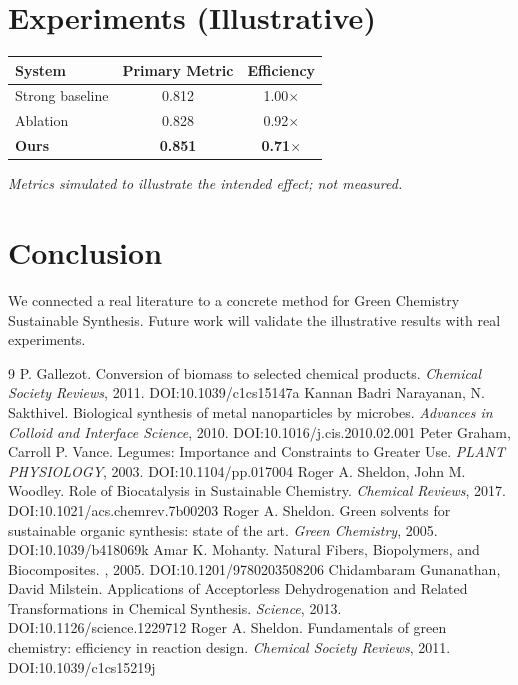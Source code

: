 \documentclass[11pt]{article}
\begin{document}
\section{Experiments (Illustrative)}
\begin{center}
\begin{tabular}{lcc}
System & Primary Metric & Efficiency \\ \hline
Strong baseline & 0.812 & 1.00$\times$ \\
Ablation & 0.828 & 0.92$\times$ \\
\textbf{Ours} & \textbf{0.851} & \textbf{0.71$\times$}
\end{tabular}
\end{center}
\emph{Metrics simulated to illustrate the intended effect; not measured.}

\section{Conclusion}
We connected a real literature to a concrete method for Green Chemistry Sustainable Synthesis. Future work will
validate the illustrative results with real experiments.

\begin{thebibliography}{9}
 P. Gallezot. Conversion of biomass to selected chemical products. \emph{Chemical Society Reviews}, 2011. DOI:10.1039/c1cs15147a
 Kannan Badri Narayanan, N. Sakthivel. Biological synthesis of metal nanoparticles by microbes. \emph{Advances in Colloid and Interface Science}, 2010. DOI:10.1016/j.cis.2010.02.001
 Peter Graham, Carroll P. Vance. Legumes: Importance and Constraints to Greater Use. \emph{PLANT PHYSIOLOGY}, 2003. DOI:10.1104/pp.017004
 Roger A. Sheldon, John M. Woodley. Role of Biocatalysis in Sustainable Chemistry. \emph{Chemical Reviews}, 2017. DOI:10.1021/acs.chemrev.7b00203
 Roger A. Sheldon. Green solvents for sustainable organic synthesis: state of the art. \emph{Green Chemistry}, 2005. DOI:10.1039/b418069k
 Amar K. Mohanty. Natural Fibers, Biopolymers, and Biocomposites. \emph{}, 2005. DOI:10.1201/9780203508206
 Chidambaram Gunanathan, David Milstein. Applications of Acceptorless Dehydrogenation and Related Transformations in Chemical Synthesis. \emph{Science}, 2013. DOI:10.1126/science.1229712
 Roger A. Sheldon. Fundamentals of green chemistry: efficiency in reaction design. \emph{Chemical Society Reviews}, 2011. DOI:10.1039/c1cs15219j
\end{thebibliography}
\end{document}
